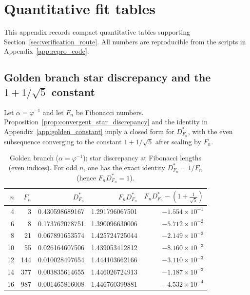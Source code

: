 \section{Quantitative fit tables}
\label{app:quant_fits}

This appendix records compact quantitative tables supporting Section~\ref{sec:verification_route}. All numbers are reproducible from the scripts in Appendix~\ref{app:repro_code}.

\subsection{Golden branch star discrepancy and the \texorpdfstring{$1+1/\sqrt{5}$}{1+1/sqrt(5)} constant}
\label{app:quant_fits_discrepancy}

Let $\alpha=\varphi^{-1}$ and let $F_n$ be Fibonacci numbers. Proposition~\ref{prop:convergent_star_discrepancy} and the identity in Appendix~\ref{app:golden_constant} imply a closed form for $D_{F_n}^*$, with the even subsequence converging to the constant $1+1/\sqrt{5}$ after scaling by $F_n$.

\begin{table}[H]
\centering
\begin{tabular}{rrrrr}
\toprule
$n$ & $F_n$ & $D_{F_n}^*$ & $F_n D_{F_n}^*$ & $F_n D_{F_n}^*-\left(1+\frac{1}{\sqrt{5}}\right)$ \\
\midrule
4  & 3   & 0.430598689167 & 1.291796067501 & $-1.554\times 10^{-1}$ \\
6  & 8   & 0.173762078751 & 1.390096630006 & $-5.712\times 10^{-2}$ \\
8  & 21  & 0.067891653574 & 1.425724725044 & $-2.149\times 10^{-2}$ \\
10 & 55  & 0.026164607506 & 1.439053412812 & $-8.160\times 10^{-3}$ \\
12 & 144 & 0.010028497654 & 1.444103662166 & $-3.110\times 10^{-3}$ \\
14 & 377 & 0.003835614655 & 1.446026724913 & $-1.187\times 10^{-3}$ \\
16 & 987 & 0.001465816008 & 1.446760399881 & $-4.532\times 10^{-4}$ \\
\bottomrule
\end{tabular}
\caption{Golden branch ($\alpha=\varphi^{-1}$): star discrepancy at Fibonacci lengths (even indices). For odd $n$, one has the exact identity $D_{F_n}^*=1/F_n$ (hence $F_nD_{F_n}^*=1$).}
\label{tab:golden_fib_discrepancy}
\end{table}

